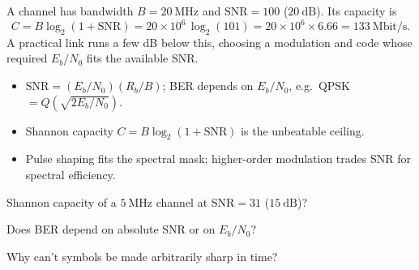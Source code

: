 \begin{workedexample}
A channel has bandwidth $B = 20\ \text{MHz}$ and $\text{SNR} = 100$
($20\ \text{dB}$). Its capacity is
\[ C = B\log_2(1+\text{SNR}) = 20\times10^{6}\,\log_2(101) = 20\times10^{6}\times6.66 = 133\ \text{Mbit/s}. \]
A practical link runs a few dB below this, choosing a modulation and code whose
required $E_b/N_0$ fits the available SNR.
\end{workedexample}

\begin{keytakeaways}
\begin{itemize}[leftmargin=1.4em,itemsep=2pt]
\item $\text{SNR} = (E_b/N_0)(R_b/B)$; BER depends on $E_b/N_0$, e.g.\ QPSK $= Q(\sqrt{2E_b/N_0})$.
\item Shannon capacity $C = B\log_2(1+\text{SNR})$ is the unbeatable ceiling.
\item Pulse shaping fits the spectral mask; higher-order modulation trades SNR for spectral efficiency.
\end{itemize}
\end{keytakeaways}

\begin{exercises}
\item Shannon capacity of a $5\ \text{MHz}$ channel at $\text{SNR} = 31$ ($15\ \text{dB}$)?
\item Does BER depend on absolute SNR or on $E_b/N_0$?
\item Why can't symbols be made arbitrarily sharp in time?
\end{exercises}

